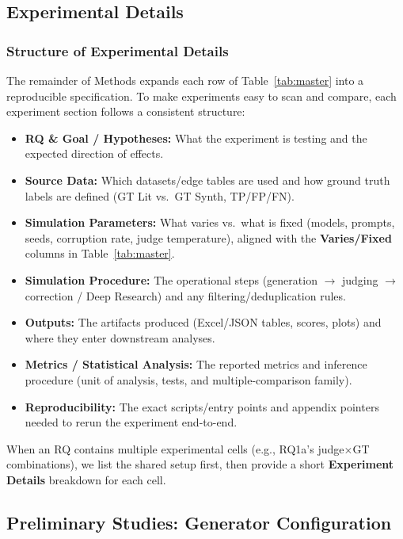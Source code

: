 \subsection{Experimental Details}
\label{sec:experimental_details}

\subsubsection{Structure of Experimental Details}
\label{sec:experiment_details_structure}

The remainder of Methods expands each row of Table~\ref{tab:master} into a reproducible specification. To make experiments easy to scan and compare, each experiment section follows a consistent structure:
\begin{itemize}[noitemsep]
    \item \textbf{RQ \& Goal / Hypotheses:} What the experiment is testing and the expected direction of effects.
    \item \textbf{Source Data:} Which datasets/edge tables are used and how ground truth labels are defined (GT Lit vs.\ GT Synth, TP/FP/FN).
    \item \textbf{Simulation Parameters:} What varies vs.\ what is fixed (models, prompts, seeds, corruption rate, judge temperature), aligned with the \textbf{Varies/Fixed} columns in Table~\ref{tab:master}.
    \item \textbf{Simulation Procedure:} The operational steps (generation $\rightarrow$ judging $\rightarrow$ correction / Deep Research) and any filtering/deduplication rules.
    \item \textbf{Outputs:} The artifacts produced (Excel/JSON tables, scores, plots) and where they enter downstream analyses.
    \item \textbf{Metrics / Statistical Analysis:} The reported metrics and inference procedure (unit of analysis, tests, and multiple-comparison family).
    \item \textbf{Reproducibility:} The exact scripts/entry points and appendix pointers needed to rerun the experiment end-to-end.
\end{itemize}

When an RQ contains multiple experimental cells (e.g., RQ1a’s judge$\times$GT combinations), we list the shared setup first, then provide a short \textbf{Experiment Details} breakdown for each cell.

\subsection{Preliminary Studies: Generator Configuration}
\label{sec:preliminary_studies}

